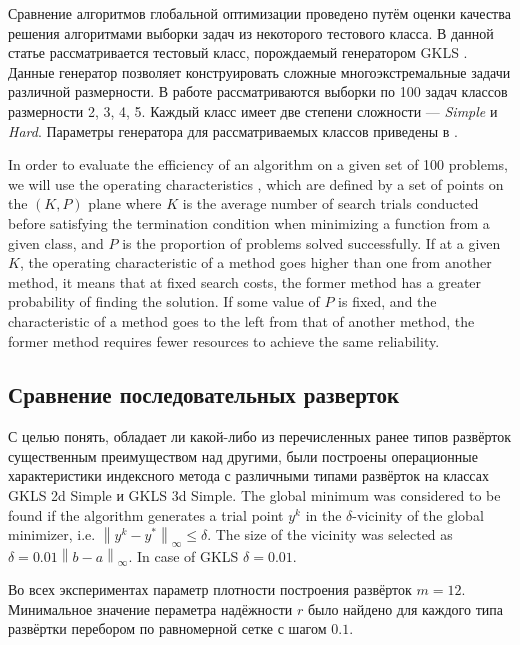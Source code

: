 \documentclass[runningheads]{llncs}
\begin{document}
Сравнение алгоритмов глобальной оптимизации проведено путём оценки качества решения алгоритмами выборки задач из некоторого тестового класса.
В данной статье рассматривается тестовый класс, порождаемый генератором GKLS \cite{Gaviano2003}. Данные генератор позволяет конструировать сложные многоэкстремальные задачи различной размерности. В работе рассматриваются выборки по 100 задач классов размерности 2, 3, 4, 5. Каждый класс имеет две степени сложности --- \textit{Simple} и \textit{Hard}. Параметры генератора для рассматриваемых классов приведены в \cite{Gaviano2003}.

In order to evaluate the efficiency of an algorithm on a given set of 100 problems, we will use the
operating characteristics \cite{grishaginClass}, which are defined by a set of
points on the \((K, P)\) plane where \(K\) is the average number of search trials
conducted before satisfying the termination condition when minimizing a function
from a given class, and \(P\) is the proportion of problems solved successfully.
If at a given \(K\), the operating characteristic of a method goes higher than one
from another method, it means that at fixed search costs, the former method has a
greater probability of finding the solution. If some value of \(P\) is fixed, and the
characteristic of a method goes to the left from that of another method, the former
method requires fewer resources to achieve the same reliability.

\subsection{Сравнение последовательных разверток}
С целью понять, обладает ли какой-либо из перечисленных ранее типов развёрток существенным преимуществом над другими, были построены операционные характеристики индексного метода с различными типами развёрток на классах GKLS 2d Simple и GKLS 3d Simple. The global minimum was considered to be found if the algorithm generates a trial point $y^k$ in the $\delta$-vicinity of the global minimizer, i.e. $\left\|y^k-y^\ast\right\|_\infty\leq\delta$. The size of the vicinity was selected as $\delta = 0.01\left\|b-a\right\|_\infty$. In case of GKLS $\delta=0.01$.

Во всех экспериментах параметр плотности построения развёрток $m=12$. Минимальное значение пераметра надёжности \(r\) было найдено для каждого типа развёртки перебором по равномерной сетке с шагом \(0.1\).
\end{document}
